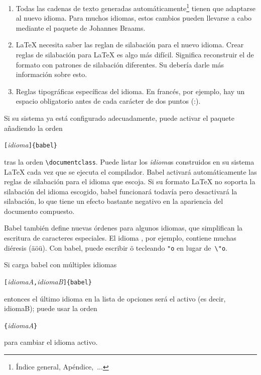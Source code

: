 \begin{enumerate}
    \item Todas las cadenas de texto generadas automáticamente\footnote{Índice general, Apéndice,~...} tienen que adaptarse al nuevo idioma.  Para muchos idiomas, estos cambios pueden llevarse a cabo mediante el paquete  de Johannes Braams.
    \item \LaTeX{} necesita saber las reglan de silabación para el nuevo idioma.  Crear reglas de silabación para  \LaTeX{} es algo más difícil.  Significa reconstruir el \filenomo{} de formato con patrones de silabación diferentes.  Su \guide{} debería darle más información sobre esto.
    \item Reglas tipográficas específicas del idioma.  En francés, por ejemplo, hay un espacio obligatorio antes de cada carácter de dos puntos (:).
\end{enumerate}

Si su sistema ya está configurado adecuadamente, puede activar el paquete   añadiendo la orden
\begin{lscommand}
\verb|[|\emph{idioma}\verb|]{babel}|
\end{lscommand}
tras la orden \verb|\documentclass|.  Puede listar los \emph{idioma}s construidos en su sistema \LaTeX{} cada vez que se ejecuta el compilador.  Babel activará automáticamente las reglas de silabación para el idioma que escoja.  Si su formato \LaTeX{} no soporta la silabación del idioma escogido, babel funcionará todavía pero desactivará la silabación, lo que tiene un efecto bastante negativo en la apariencia del documento compuesto.

\textsf{Babel} también define nuevas órdenes para algunos idiomas, que simplifican la escritura de caracteres especiales.  El idioma , por ejemplo, contiene muchas diéresis (\"a\"o\"u).  Con \textsf{babel}, puede escribir \"o tecleando \verb|"o| en lugar de~\verb|\"o|.

Si carga babel con múltiples idiomas
\begin{lscommand}
\verb|[|\emph{idiomaA}\verb|,|\emph{idiomaB}\verb|]{babel}| 
\end{lscommand}
entonces el último idioma en la lista de opciones será el activo (es decir, idiomaB); puede usar la orden
\begin{lscommand}
\verb|{|\emph{idiomaA}\verb|}|
\end{lscommand}
para cambiar el idioma activo.

